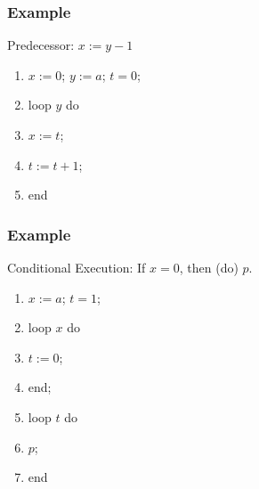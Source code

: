 \documentclass{beamer}
\begin{document}
\begin{frame}
	\frametitle{Example}

	Predecessor: $x:= y - 1$ 
	
	\vspace{0.5cm}

	\begin{enumerate}
		\item[] $x := 0$; $y := a$; $t = 0$;
		\item[] loop $y$ do 
		\item[] \hspace{0.5cm} $x := t$;
		\item[] \hspace{0.5cm} $t := t + 1$;
		\item[] end
	\end{enumerate}

	\vspace{5cm}


\end{frame}

\begin{frame}
	\frametitle{Example}

	Conditional Execution: If $x = 0$, then (do) $p$. 
	
	\vspace{0.5cm}

	\begin{enumerate}
		\item[] $x := a$; $t = 1$;
		\item[] loop $x$ do 
		\item[] \hspace{0.5cm} $t := 0$;
		\item[] end;
		\item[] loop $t$ do
		\item[] \hspace{0.5cm} $p$;
		\item[] end
	\end{enumerate}

	\vspace{5cm}

	
\end{frame}
\end{document}
